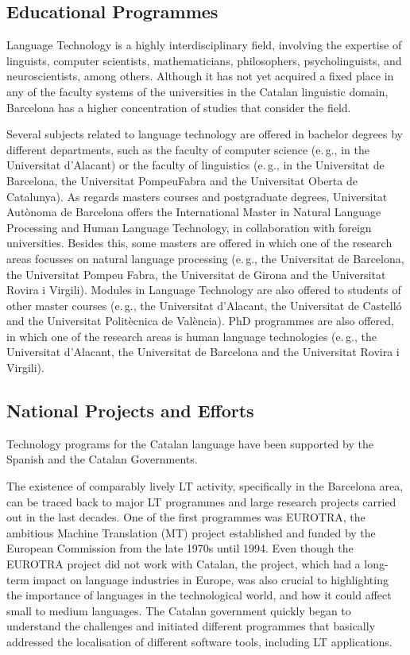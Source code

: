 \begin{multicols}{2}
\subsection{Educational Programmes}

Language Technology is a highly interdisciplinary field, involving the expertise of linguists, computer scientists, mathematicians, philosophers, psycholinguists, and neuroscientists, among others. Although it has not yet acquired a fixed place in any of the faculty systems of the universities in the Catalan linguistic domain, Barcelona has a higher concentration of studies that consider the field. 


Several subjects related to language technology are offered in bachelor degrees by different departments, such as the faculty of computer science (e.\,g., in the Universitat d’Alacant) or the faculty of linguistics (e.\,g., in the Universitat de Barcelona, the Universitat PompeuFabra and the Universitat Oberta de Catalunya).
As regards masters courses and postgraduate degrees, Universitat Autònoma de Barcelona offers the International Master in Natural Language Processing and Human Language Technology, in collaboration with foreign universities. Besides this, some masters are offered in which one of the research areas focusses on natural language processing (e.\,g., the Universitat de Barcelona, the Universitat Pompeu Fabra, the Universitat de Girona and the Universitat Rovira i Virgili). Modules in Language Technology are also offered to students of other master courses (e.\,g., the Universitat d’Alacant, the Universitat de Castelló and the Universitat Politècnica de València). 
PhD programmes are also offered, in which one of the research areas is human language technologies (e.\,g., the Universitat d’Alacant, the Universitat de Barcelona and the Universitat Rovira i Virgili).

\subsection{National Projects and Efforts}

Technology programs for the Catalan language have been supported by the Spanish and the Catalan Governments.

The existence of comparably lively LT activity, specifically in the Barcelona area, can be traced back to major LT programmes and large research projects carried out in the last decades. One of the first programmes was EUROTRA, the ambitious Machine Translation (MT) project established and funded by the European Commission from the late 1970s until 1994. Even though the EUROTRA project did not work with Catalan, the project, which had a long-term impact on language industries in Europe, was also crucial to highlighting the importance of languages in the technological world, and how it could affect small to medium languages. The Catalan government quickly began to understand the challenges and initiated different programmes that basically addressed the localisation of different software tools, including LT applications. 


\end{multicols}
